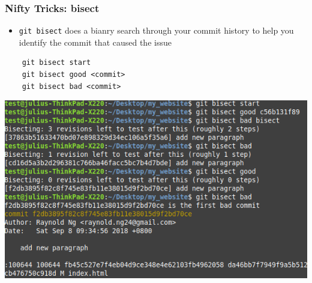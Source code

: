 \documentclass[12pt]{beamer}
\begin{document}
\begin{frame}[fragile]
\frametitle{Nifty Tricks: bisect}
\begin{itemize}
	\item \texttt{git bisect} does a bianry search through your commit history to help you identify the commit that caused the issue
\end{itemize}
\begin{center}
	\begin{verbatim}
	git bisect start
	git bisect good <commit>
	git bisect bad <commit>
	\end{verbatim}
	\includegraphics[width=0.7\linewidth]{git_bisect}
\end{center}
\end{frame}
\end{document}
